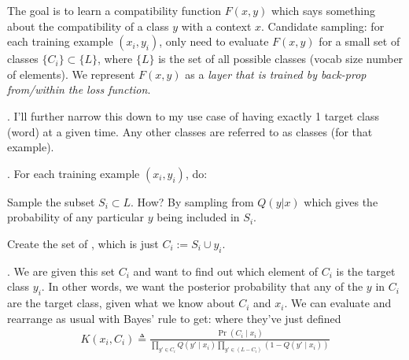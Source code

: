 \documentclass[11pt]{article}
\newcommand\myspace[1][]{\vspace{#1\bigskipamount}}
\newcommand\p{\Needspace{10\baselineskip} \noindent}
\begin{document}
\myspace
{} The goal is to learn a compatibility function $F(x, y)$ which says something about the compatibility of a class $y$ with a context $x$. Candidate sampling: for each training example $(x_i, y_i)$, only need to evaluate $F(x, y)$ for a small set of classes $\{C_i\} \subset \{L\}$, where $\{L\}$ is the set of all possible classes (vocab size number of elements). We represent $F(x, y)$ as a \textit{layer that is trained by back-prop from/within the loss function}. 

\myspace
\p {}. I'll further narrow this down to my use case of having exactly 1 target class (word) at a given time. Any other classes are referred to as  classes (for that example). 

\myspace
\p {}. For each training example $(x_i, y_i)$, do:
\begin{compactitem}
	\item Sample the subset $S_i \subset L$. How? By sampling from $Q(y|x)$ which gives the probability of any particular $y$ being included in $S_i$. 
	
	\item Create the set of , which is just $C_i := S_i \cup y_i$. 
\end{compactitem}

\myspace
\p {}. We are given this set $C_i$ and want to find out which element of $C_i$ is the target class $y_i$. In other words, we want the posterior probability that any of the $y$ in $C_i$ are the target class, given what we know about $C_i$ and $x_i$. We can evaluate and rearrange as usual with Bayes' rule to get:
where they've just defined 
\begin{align}
	K(x_i, C_i) \triangleq \frac{ \Pr\left(C_i \mid x_i \right) }{
		\prod_{y'\in C_i} Q(y' \mid x_i)
		\prod_{y'\in(L - C_i)} \left( 1 - Q(y' \mid x_i)\right)
		}
\end{align}
\end{document}
